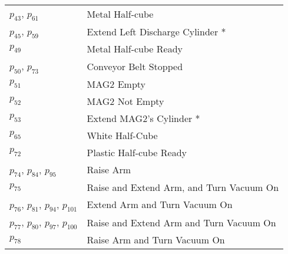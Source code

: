 \begin{longtable}{m{5cm}m{5cm}}
\hyperlink{completeNet:p43}{\hypertarget{completeTable:p43}{$p_{43}$}}, \hyperlink{completeNet:p61}{\hypertarget{completeTable:p61}{$p_{61}$}} & Metal Half-cube\\
\hyperlink{completeNet:p45}{\hypertarget{completeTable:p45}{$p_{45}$}}, \hyperlink{completeNet:p59}{\hypertarget{completeTable:p59}{$p_{59}$}} & Extend Left Discharge Cylinder *\\
\hyperlink{completeNet:p49}{\hypertarget{completeTable:p49}{$p_{49}$}} & Metal Half-cube Ready\\
\hyperlink{completeNet:p50}{\hypertarget{completeTable:p50}{$p_{50}$}}, \hyperlink{completeNet:p73}{\hypertarget{completeTable:p73}{$p_{73}$}} & Conveyor Belt Stopped\\
\hyperlink{completeNet:p51}{\hypertarget{completeTable:p51}{$p_{51}$}} & MAG2 Empty\\
\hyperlink{completeNet:p52}{\hypertarget{completeTable:p52}{$p_{52}$}} & MAG2 Not Empty\\
\hyperlink{completeNet:p53}{\hypertarget{completeTable:p53}{$p_{53}$}} & Extend MAG2's Cylinder *\\
\hyperlink{completeNet:p65}{\hypertarget{completeTable:p65}{$p_{65}$}} & White Half-Cube\\
\hyperlink{completeNet:p72}{\hypertarget{completeTable:p72}{$p_{72}$}} & Plastic Half-cube Ready\\
\hyperlink{completeNet:p74}{\hypertarget{completeTable:p74}{$p_{74}$}}, \hyperlink{completeNet:p84}{\hypertarget{completeTable:p84}{$p_{84}$}}, \hyperlink{completeNet:p95}{\hypertarget{completeTable:p95}{$p_{95}$}} & Raise Arm\\
\hyperlink{completeNet:p75}{\hypertarget{completeTable:p75}{$p_{75}$}} & Raise and Extend Arm, and Turn Vacuum On\\
\hyperlink{completeNet:p76}{\hypertarget{completeTable:p76}{$p_{76}$}}, \hyperlink{completeNet:p81}{\hypertarget{completeTable:p81}{$p_{81}$}}, \hyperlink{completeNet:p94}{\hypertarget{completeTable:p94}{$p_{94}$}}, \hyperlink{completeNet:p101}{\hypertarget{completeTable:p101}{$p_{101}$}} & Extend Arm and Turn Vacuum On\\
\hyperlink{completeNet:p77}{\hypertarget{completeTable:p77}{$p_{77}$}}, \hyperlink{completeNet:p80}{\hypertarget{completeTable:p80}{$p_{80}$}}, \hyperlink{completeNet:p97}{\hypertarget{completeTable:p97}{$p_{97}$}}, \hyperlink{completeNet:p100}{\hypertarget{completeTable:p100}{$p_{100}$}} & Raise and Extend Arm and Turn Vacuum On\\
\hyperlink{completeNet:p78}{\hypertarget{completeTable:p78}{$p_{78}$}} & Raise Arm and Turn Vacuum On\\

\end{longtable}

